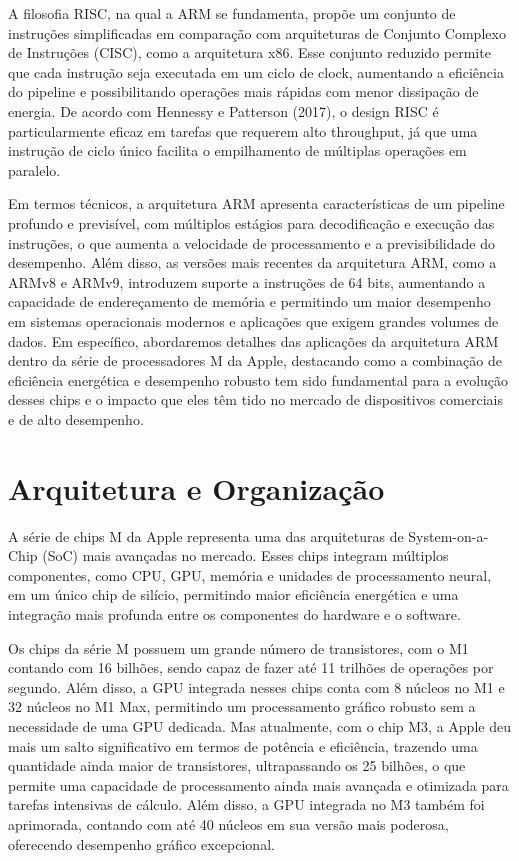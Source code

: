 \documentclass[a4paper,times,12pt]{article}
\begin{document}
A filosofia RISC, na qual a ARM se fundamenta, propõe um conjunto de instruções simplificadas em comparação com arquiteturas de Conjunto Complexo de Instruções (CISC), como a arquitetura x86. Esse conjunto reduzido permite que cada instrução seja executada em um ciclo de clock, aumentando a eficiência do pipeline e possibilitando operações mais rápidas com menor dissipação de energia. De acordo com Hennessy e Patterson (2017), o design RISC é particularmente eficaz em tarefas que requerem alto throughput, já que uma instrução de ciclo único facilita o empilhamento de múltiplas operações em paralelo.

Em termos técnicos, a arquitetura ARM apresenta características de um pipeline profundo e previsível, com múltiplos estágios para decodificação e execução das instruções, o que aumenta a velocidade de processamento e a previsibilidade do desempenho. Além disso, as versões mais recentes da arquitetura ARM, como a ARMv8 e ARMv9, introduzem suporte a instruções de 64 bits, aumentando a capacidade de endereçamento de memória e permitindo um maior desempenho em sistemas operacionais modernos e aplicações que exigem grandes volumes de dados. Em específico, abordaremos detalhes das aplicações da arquitetura ARM dentro da série de processadores M da Apple, destacando como a combinação de eficiência energética e desempenho robusto tem sido fundamental para a evolução desses chips e o impacto que eles têm tido no mercado de dispositivos comerciais e de alto desempenho.

\newpage
\section{Arquitetura e Organização}
\hspace{+15pt} A série de chips M da Apple representa uma das arquiteturas de System-on-a-Chip (SoC) mais avançadas no mercado. Esses chips integram múltiplos componentes, como CPU, GPU, memória e unidades de processamento neural, em um único chip de silício, permitindo maior eficiência energética e uma integração mais profunda entre os componentes do hardware e o software.

Os chips da série M possuem um grande número de transistores, com o M1 contando com 16 bilhões, sendo capaz de fazer até 11 trilhões de operações por segundo. Além disso, a GPU integrada nesses chips conta com 8 núcleos no M1 e 32 núcleos no M1 Max, permitindo um processamento gráfico robusto sem a necessidade de uma GPU dedicada. Mas atualmente, com o chip M3, a Apple deu mais um salto significativo em termos de potência e eficiência, trazendo uma quantidade ainda maior de transistores, ultrapassando os 25 bilhões, o que permite uma capacidade de processamento ainda mais avançada e otimizada para tarefas intensivas de cálculo. Além disso, a GPU integrada no M3 também foi aprimorada, contando com até 40 núcleos em sua versão mais poderosa, oferecendo desempenho gráfico excepcional.
\end{document}
